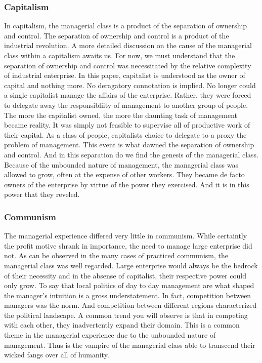 \documentclass[12pt]{article}
\begin{document}
\subsubsection{Capitalism}
In capitalism, the managerial class is a product of the separation of ownership and control.
The separation of ownership and control is a product of the industrial revolution.
A more detailed discussion on the cause of the managerial class within a capitalism awaits us.
For now, we must understand that the separation of ownership and control was necessitated by the relative complexity of industrial enterprise.
In this paper, capitalist is understood as the owner of capital and nothing more.
No deragatory connotation is implied.
No longer could a single capitalist manage the affairs of the enterprise.
Rather, they were forced to delegate away the responsibliity of management to another group of people.
The more the capitalist owned, the more the daunting task of management became reality.
It was simply not feasible to supervise all of productive work of their capital.
As a class of people, capitalists choice to delegate to a proxy the problem of management.
This event is what dawned the separation of ownership and control.
And in this separation do we find the genesis of the managerial class.
Because of the unbounded nature of management, the managerial class was allowed to grow, often at the expense of other workers.
They became de facto owners of the enterprise by virtue of the power they exercised.
And it is in this power that they reveled.

\subsubsection{Communism}
The managerial experience differed very little in communism.
While certaintly the profit motive shrank in importance, the need to manage large enterprise did not.
As can be observed in the many cases of practiced communism, the managerial class was well regarded.
Large enterprise would always be the bedrock of their necessity and in the absense of capitalist, their respective power could only grow.
To say that local politics of day to day management are what shaped the manager's intuition is a gross understatement.
In fact, competition between managers was the norm.
And competition between different regions characterized the political landscape.
A common trend you will observe is that in competing with each other, they inadvertently expand their domain.
This is a common theme in the managerial experience due to the unbounded nature of management.
Thus is the vampire of the managerial class able to transcend their wicked fangs over all of humanity.
\end{document}
